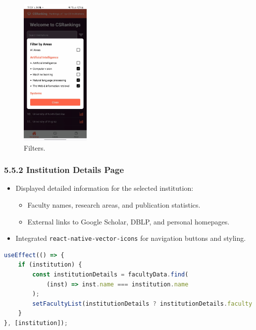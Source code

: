 \documentclass[12pt]{article}
\begin{document}
\begin{figure}[H]
    \centering
    \includegraphics[width=0.3\textwidth, height=0.4\textheight]{filter.jpg} %
    \caption{Filters.}
    \label{fig:example_image}
\end{figure}

\subsubsection*{5.5.2 Institution Details Page}
\begin{itemize}
    \item Displayed detailed information for the selected institution:
    \begin{itemize}
        \item Faculty names, research areas, and publication statistics.
        \item External links to Google Scholar, DBLP, and personal homepages.
    \end{itemize}
    \item Integrated \texttt{react-native-vector-icons} for navigation buttons and styling.
\end{itemize}
\begin{lstlisting}[language=JavaScript, caption={Fetching Faculty Data based on Institution}, label={lst:useEffectFaculty}]
useEffect(() => {
    if (institution) {
        const institutionDetails = facultyData.find(
            (inst) => inst.name === institution.name
        );
        setFacultyList(institutionDetails ? institutionDetails.faculty : []);
    }
}, [institution]);
\end{lstlisting}
\end{document}

